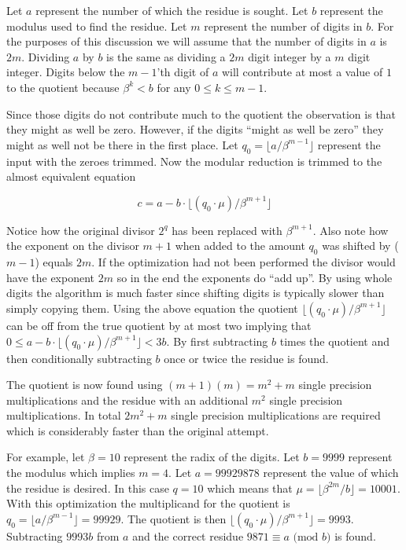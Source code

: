 \documentclass[b5paper]{book}
\begin{document}
Let $a$ represent the number of which the residue is sought.  Let $b$ represent the modulus used to find the residue.  Let $m$ represent
the number of digits in $b$.  For the purposes of this discussion we will assume that the number of digits in $a$ is $2m$.  Dividing $a$ by 
$b$ is the same as dividing a $2m$ digit integer by a $m$ digit integer.  Digits below the $m - 1$'th digit of $a$ will contribute at most a value
of $1$ to the quotient because $\beta^k < b$ for any $0 \le k \le m - 1$.  

Since those digits do not contribute much to the quotient the observation is that they might as well be zero.  However, if the digits 
``might as well be zero'' they might as well not be there in the first place.  Let $q_0 = \lfloor a/\beta^{m-1} \rfloor$ represent the input
with the zeroes trimmed.  Now the modular reduction is trimmed to the almost equivalent equation

\begin{equation}
c = a - b \cdot \lfloor (q_0 \cdot \mu) / \beta^{m+1} \rfloor
\end{equation}

Notice how the original divisor $2^q$ has been replaced with $\beta^{m+1}$. Also note how the exponent on the divisor $m+1$ when added to the amount $q_0$
was shifted by ($m-1$) equals $2m$.  If the optimization had not been performed the divisor would have the exponent $2m$ so in the end the exponents
do ``add up''. By using whole digits the algorithm is much faster since shifting digits is typically slower than simply copying them.  Using the 
above equation the quotient $\lfloor (q_0 \cdot \mu) / \beta^{m+1} \rfloor$ can be off from the true quotient by at most two implying that 
$0 \le a - b \cdot \lfloor (q_0 \cdot \mu) / \beta^{m+1} \rfloor < 3b$.  By first subtracting $b$ times the quotient and then conditionally 
subtracting $b$ once or twice the residue is found.

The quotient is now found using $(m + 1)(m) = m^2 + m$ single precision multiplications and the residue with an additional $m^2$ single
precision multiplications.  In total $2m^2 + m$ single precision multiplications are required which is considerably faster than the original
attempt.

For example, let $\beta = 10$ represent the radix of the digits.  Let $b = 9999$ represent the modulus which implies $m = 4$. Let $a = 99929878$ 
represent the value of which the residue is desired.  In this case $q = 10$ which means that $\mu = \lfloor \beta^{2m}/b \rfloor = 10001$.  
With this optimization the multiplicand for the quotient is $q_0 = \lfloor a / \beta^{m - 1} \rfloor = 99929$.  The quotient is then 
$\lfloor (q_0 \cdot \mu) / \beta^{m+1} \rfloor = 9993$.  Subtracting $9993b$ from $a$ and the correct residue $9871 \equiv a \mbox{ (mod }b\mbox{)}$ 
is found.  
\end{document}
